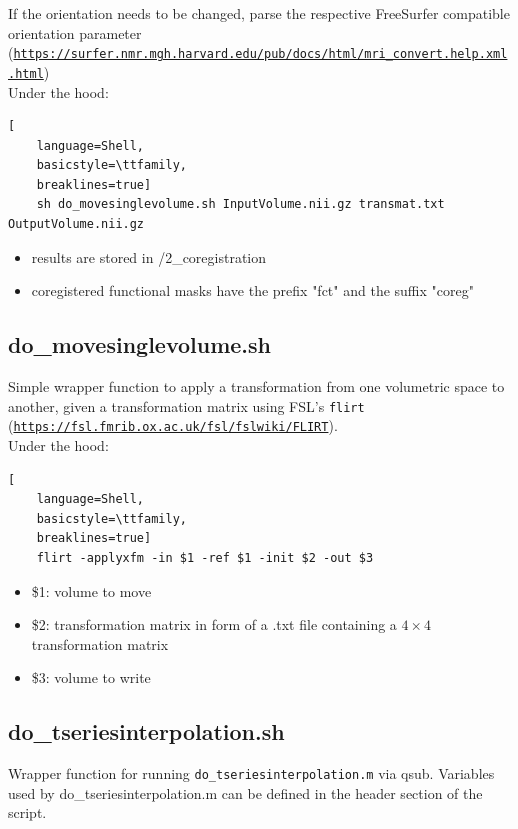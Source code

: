 \documentclass[12pt,a4paper]{scrartcl}
\begin{document}
\noindent If the orientation needs to be changed, parse the respective FreeSurfer compatible orientation parameter (\href{https://surfer.nmr.mgh.harvard.edu/pub/docs/html/mri_convert.help.xml.html}{\nolinkurl{https://surfer.nmr.mgh.harvard.edu/pub/docs/html/mri\_convert.help.xml.html}})\\

\noindent Under the hood:
\begin{lstlisting}[
    language=Shell,
    basicstyle=\ttfamily,
    breaklines=true]
    sh do_movesinglevolume.sh InputVolume.nii.gz transmat.txt OutputVolume.nii.gz
\end{lstlisting}
\begin{itemize}
\item results are stored in /2\_coregistration
\item coregistered functional masks have the prefix "fct" and the suffix "coreg"
\end{itemize}

\subsection{do\_movesinglevolume.sh}
Simple wrapper function to apply a transformation from one volumetric space to another, given a transformation matrix using FSL's \texttt{flirt} (\href{https://fsl.fmrib.ox.ac.uk/fsl/fslwiki/FLIRT}{\nolinkurl{https://fsl.fmrib.ox.ac.uk/fsl/fslwiki/FLIRT}}).\\

\noindent Under the hood:
\begin{lstlisting}[
    language=Shell,
    basicstyle=\ttfamily,
    breaklines=true]
    flirt -applyxfm -in $1 -ref $1 -init $2 -out $3
\end{lstlisting}
\begin{itemize}
\item \$1: volume to move
\item \$2: transformation matrix in form of a .txt file containing a $4\times4$ transformation matrix
\item \$3: volume to write
\end{itemize}

\subsection{do\_tseriesinterpolation.sh}
\label{sec:tseriesinterp}
Wrapper function for running \texttt{do\_tseriesinterpolation.m} via qsub. Variables used by do\_tseriesinterpolation.m can be defined in the header section of the script.
\end{document}
